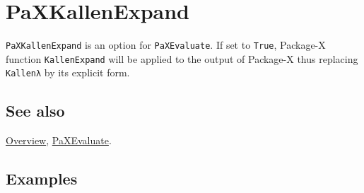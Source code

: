\documentclass[../FeynHelpersManual.tex]{subfiles}
\begin{document}
\hypertarget{paxkallenexpand}{
\section{PaXKallenExpand}\label{paxkallenexpand}}

\texttt{PaXKallenExpand} is an option for \texttt{PaXEvaluate}. If set
to \texttt{True}, Package-X function \texttt{KallenExpand} will be
applied to the output of Package-X thus replacing \texttt{Kallenλ} by
its explicit form.

\subsection{See also}

\hyperlink{toc}{Overview}, \hyperlink{paxevaluate}{PaXEvaluate}.

\subsection{Examples}
\end{document}
